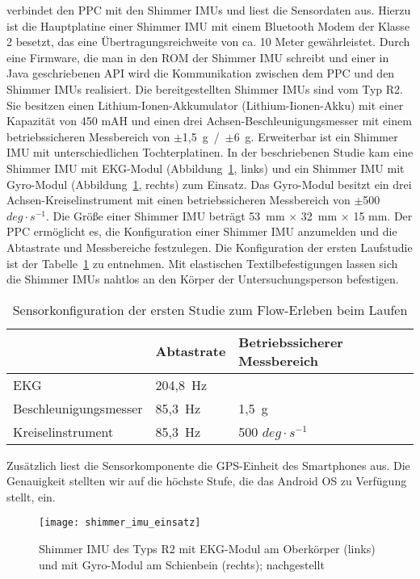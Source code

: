 verbindet den \ac{PPC} mit den Shimmer \acp{IMU} und liest die Sensordaten aus. Hierzu ist die Hauptplatine einer Shimmer \ac{IMU} mit einem Bluetooth Modem der Klasse 2 besetzt, das eine Übertragungsreichweite von ca. 10 Meter gewährleistet. Durch eine Firmware, die man in den \acs{ROM} der Shimmer \ac{IMU} schreibt und einer in Java geschriebenen \acs{API} wird die Kommunikation zwischen dem \ac{PPC} und den Shimmer \acp{IMU} realisiert. Die bereitgestellten Shimmer \acp{IMU} sind vom Typ R2. Sie besitzen einen Lithium-Ionen-Akkumulator (Lithium-Iionen-Akku) mit einer Kapazität von 450 mAH und einen drei Achsen-Beschleunigungsmesser mit einem betriebssicheren Messbereich von \mbox{$\pm$1,5~g / $\pm$6 g}. Erweiterbar ist ein Shimmer \ac{IMU} mit unterschiedlichen Tochterplatinen. In der beschriebenen Studie kam eine Shimmer \ac{IMU} mit EKG-Modul (Abbildung~\ref{fig:shimmer_imu_einsatz}, links) und ein Shimmer \ac{IMU} mit Gyro-Modul (Abbildung~\ref{fig:shimmer_imu_einsatz}, rechts) zum Einsatz. Das Gyro-Modul besitzt ein drei Achsen-Kreiselinstrument mit einen betriebssicheren Messbereich von \mbox{$\pm$500 $deg \cdot s^{-1}$}. Die Größe einer Shimmer \ac{IMU} beträgt 53~mm $\times$ 32~mm $\times$ 15 mm. Der \ac{PPC} ermöglicht es, die Konfiguration einer Shimmer \ac{IMU} anzumelden und die Abtastrate und Messbereiche festzulegen. Die Konfiguration der ersten Laufstudie ist der Tabelle~\ref{tab:sensorkonfiguration_1} zu entnehmen. Mit elastischen Textilbefestigungen lassen sich die Shimmer \acp{IMU} nahtlos an den Körper der Untersuchungsperson befestigen. 
\begin{table}
	[!htb] \caption[Sensorkonfiguration der ersten Studie zum Flow-Erleben beim Laufen]{Sensorkonfiguration der ersten Studie zum Flow-Erleben beim Laufen} \label{tab:sensorkonfiguration_1} 
	\begin{tabularx}
		{ 
		\textwidth}{p{} p{} p{}} \toprule & Abtastrate & Betriebssicherer Messbereich \\
		\midrule EKG & 204,8~Hz & \\
		Beschleunigungsmesser & 85,3~Hz & 1,5~g \\
		Kreiselinstrument & 85,3~Hz & 500 $deg \cdot s^{-1}$ \\
		\bottomrule 
	\end{tabularx}
\end{table}

Zusätzlich liest die Sensorkomponente die \ac{GPS}-Einheit des Smartphones aus. Die Genauigkeit stellten wir auf die höchste Stufe, die das Android OS zu Verfügung stellt, ein. 
\begin{figure}
	[!htb] \centering 
	\texttt{[image: shimmer\_imu\_einsatz]} \caption[Shimmer IMUs mit Modulen]{Shimmer IMU des Typs R2 mit EKG-Modul am Oberkörper (links) und mit Gyro-Modul am Schienbein (rechts); nachgestellt} \label{fig:shimmer_imu_einsatz} 
\end{figure}

